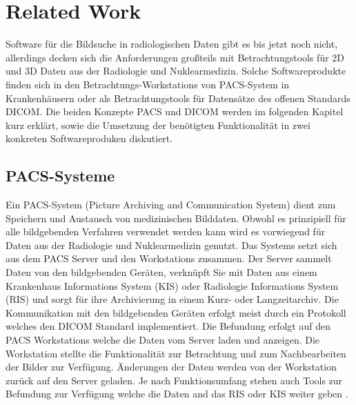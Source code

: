
\section{Related Work}
\label{sec:relatedWork}
Software für die Bildsuche in radiologischen Daten gibt es bis jetzt noch nicht,  
allerdings decken sich die Anforderungen großteils mit Betrachtungstools für 2D und 3D Daten aus der Radiologie und Nuklearmedizin. 
Solche Softwareprodukte finden sich in den Betrachtungs-Workstations von PACS-System in Krankenhäusern oder als Betrachtungstools für Datensätze des offenen Standards DICOM.
Die beiden Konzepte PACS und DICOM werden im folgenden Kapitel kurz erklärt, sowie die Umsetzung der benötigten Funktionalität in zwei konkreten Softwareproduken diskutiert.

\subsection{PACS-Systeme}
\label{sec:PACS-Systeme}
Ein PACS-System (Picture Archiving and Communication System) dient zum Speichern und Austausch von medizinischen Bilddaten.
Obwohl es prinzipiell für alle bildgebenden Verfahren verwendet werden kann wird es vorwiegend für Daten aus der Radiologie und Nuklearmedizin genutzt.
%
Das Systems setzt sich aus dem PACS Server und den Workstations zusammen.
Der Server sammelt Daten von den bildgebenden Geräten,
 verknüpft Sie mit Daten aus einem Krankenhaus Informations System (KIS) oder Radiologie Informations System (RIS) und sorgt für ihre Archivierung in einem Kurz- oder Langzeitarchiv. 
Die Kommunikation mit den bildgebenden Geräten erfolgt meist durch ein Protokoll welches den DICOM Standard implementiert.
%
Die Befundung erfolgt auf den PACS Workstations welche die Daten vom Server laden und anzeigen.
Die Workstation stellte die Funktionalität zur Betrachtung und zum Nachbearbeiten der Bilder zur Verfügung.
Änderungen der Daten werden von der Workstation zurück auf den Server geladen.
Je nach Funktionsumfang stehen auch Tools zur Befundung zur Verfügung welche die Daten and das RIS oder KIS weiter geben \cite{pacs}.

